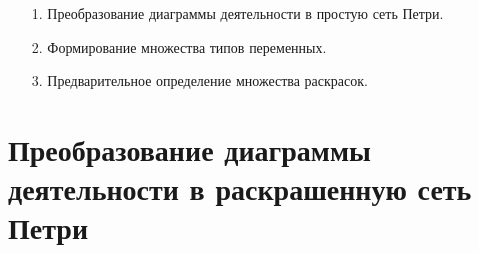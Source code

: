 \documentclass[12pt]{article}
\begin{document}
\begin{minipage}[H]{0.55\linewidth}
\end{minipage}
\hfill
\begin{minipage}[H]{0.44\linewidth}
	\begin{enumerate}
	\item[1.] Преобразование диаграммы деятельности в простую сеть Петри.
	\item[2.] Формирование множества типов переменных.
	\item[3.] Предварительное определение множества раскрасок.
	\end{enumerate}
\end{minipage}

\section{Преобразование диаграммы деятельности в раскрашенную сеть  Петри}
\end{document}

